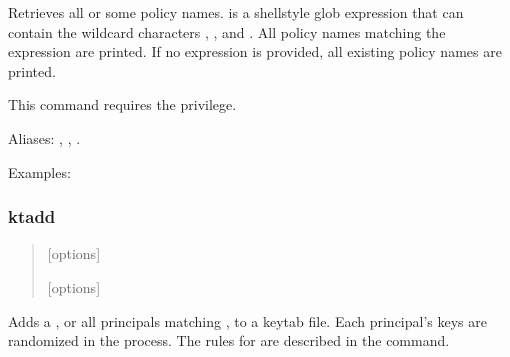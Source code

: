 \documentclass[letterpaper,10pt,english]{sphinxmanual}
\begin{document}
\sphinxAtStartPar
Retrieves all or some policy names.   is a shell\sphinxhyphen{}style
glob expression that can contain the wild\sphinxhyphen{}card characters ,
\sphinxcode{\sphinxupquote{*}}, and \sphinxcode{\sphinxupquote{{[}{]}}}.  All policy names matching the expression are
printed.  If no expression is provided, all existing policy names are
printed.

\sphinxAtStartPar
This command requires the  privilege.

\sphinxAtStartPar
Aliases: , , .

\sphinxAtStartPar
Examples:

\begin{sphinxVerbatim}[commandchars=\\\{\}]
  

   
\end{sphinxVerbatim}


\subsubsection{ktadd}
\label{\detokenize{admin/admin_commands/kadmin_local:ktadd}}\label{\detokenize{admin/admin_commands/kadmin_local:id17}}\begin{quote}

\begin{DUlineblock}{0em}
\item[]  {[}options{]} 
\item[]  {[}options{]}  
\end{DUlineblock}
\end{quote}

\sphinxAtStartPar
Adds a , or all principals matching , to a
keytab file.  Each principal’s keys are randomized in the process.
The rules for  are described in the 
command.
\end{document}

